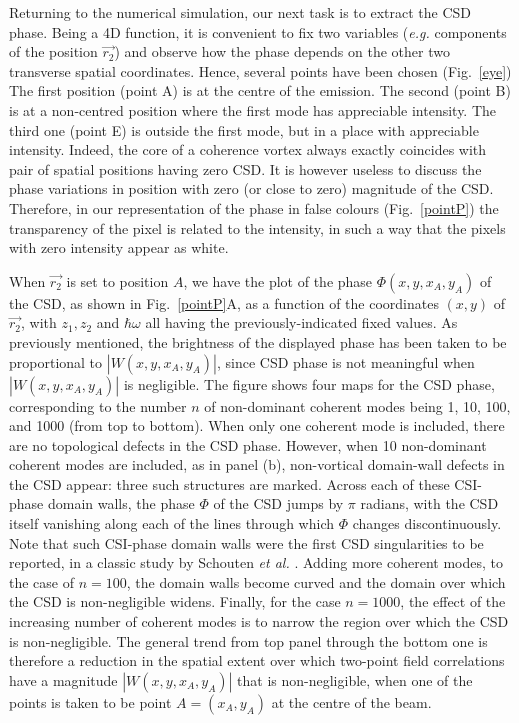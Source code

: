 \documentclass{iucr}              %
\begin{document}
Returning to the numerical simulation, our next task is to extract the CSD phase. Being a 4D function, it is convenient to fix two variables ({\em e.g.} components of the position $\vec{r_2}$) and observe how the phase depends on the other two transverse spatial coordinates. Hence, several points have been chosen (Fig.~\ref{eye}) The first position (point A) is at the centre of the emission. The second (point B) is at a non-centred position where the first mode has appreciable intensity. The third one (point E) is outside the first mode, but in a place with appreciable intensity. Indeed, the core of a coherence vortex always exactly coincides with pair of spatial positions having zero CSD. It is however useless to discuss the phase variations in position with zero (or close to zero) magnitude of the CSD. Therefore, in our representation of the phase in false colours (Fig.~\ref{pointP}) the transparency of the pixel is related to the intensity, in such a way that the pixels with zero intensity appear as white. 

When $\vec{r_2}$ is set to position $A$, we have the plot of the phase $\Phi(x,y,x_A,y_A)$ of the CSD, as shown in Fig.~\ref{pointP}A, as a function of the coordinates $(x,y)$ of $\vec{r_2}$, with $z_1, z_2$ and $\hbar\omega$ all having the previously-indicated fixed values.  As previously mentioned, the brightness of the displayed phase has been taken to be proportional to $|W(x,y,x_A,y_A)|$, since CSD phase is not meaningful when $|W(x,y,x_A,y_A)|$ is negligible.  The figure shows four maps for the CSD phase, corresponding to the number $n$ of non-dominant coherent modes being 1, 10, 100, and 1000 (from top to bottom).  When only one coherent mode is included, there are no topological defects in the CSD phase.  However, when 10 non-dominant coherent modes are included, as in panel (b), non-vortical domain-wall defects in the CSD appear: three such structures are marked.  Across each of these CSI-phase domain walls, the phase $\Phi$ of the CSD jumps by $\pi$ radians, with the CSD itself vanishing along each of the lines through which $\Phi$ changes discontinuously.  Note that such CSI-phase domain walls were the first CSD singularities to be reported, in a classic study by Schouten {\em et al.} \citeyear{Schouten2003}.  Adding more coherent modes, to the case of $n=100$, the domain walls become curved and the domain over which the CSD is non-negligible widens.  Finally, for the case  $n=1000$, the effect of the increasing number of coherent modes is to narrow the region over which the CSD is non-negligible.  The general trend from top panel through the bottom one is therefore a reduction in the spatial extent over which two-point field correlations have a magnitude $|W(x,y,x_A,y_A)|$ that is non-negligible, when one of the points is taken to be point $A=(x_A,y_A)$ at the centre of the beam.           
\end{document}
